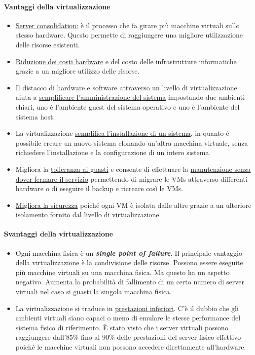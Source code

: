 \documentclass{article}
\begin{document}
\paragraph{Vantaggi della virtualizzazione} 
\begin{itemize}
    \item \uline{Server consolidation:} è il processo che fa girare più macchine virtuali sullo stesso hardware. Questo permette di raggiungere una migliore utilizzazione delle risorse esistenti.
    \item \uline{Riduzione dei costi hardware} e del costo delle infrastrutture informatiche grazie a un migliore utilizzo delle risorse.
    \item Il distacco di hardware e software attraverso un livello di virtualizzazione aiuta a \uline{semplificare l'amministrazione del sistema} impostando due ambienti chiari, uno è l’ambiente guest del sistema operativo e uno è l’ambiente del sistema host.
    \item La virtualizzazione \uline{semplifica l'installazione di un sistema}, in quanto è possibile creare un nuovo sistema clonando un’altra macchina virtuale, senza richiedere l'installazione e la configurazione di un intero sistema.
    \item Migliora la \uline{tolleranza ai guasti} e consente di effettuare la \uline{manutenzione senza dover fermare il servizio} permettendo di migrare le VMs attraverso differenti hardware o di eseguire il backup e ricreare così le VMs.
    \item \uline{Migliora la sicurezza} poiché ogni VM è isolata dalle altre grazie a un ulteriore isolamento fornito dal livello di virtualizzazione 
\end{itemize}
\paragraph{Svantaggi della virtualizzazione}
\begin{itemize}
    \item Ogni macchina fisica è un \textit{\textbf{single point of failure}}. Il principale vantaggio della virtualizzazione è la condivisione delle risorse. Possono essere eseguite più macchine virtuali su una macchina fisica. Ma questo ha un aspetto negativo. Aumenta la probabilità di fallimento di un certo numero di server virtuali nel caso si guasti la singola macchina fisica.
    \item La virtualizzazione si traduce in \uline{prestazioni inferiori}. C'è il dubbio che gli ambienti virtuali siano capaci o meno di emulare le stesse performance del sistema fisico di riferimento. È stato visto che i server virtuali possono raggiungere dall'85\% fino al 90\% delle prestazioni del server fisico effettivo poiché le macchine virtuali non possono accedere direttamente all'hardware.
\end{itemize}
\end{document}
